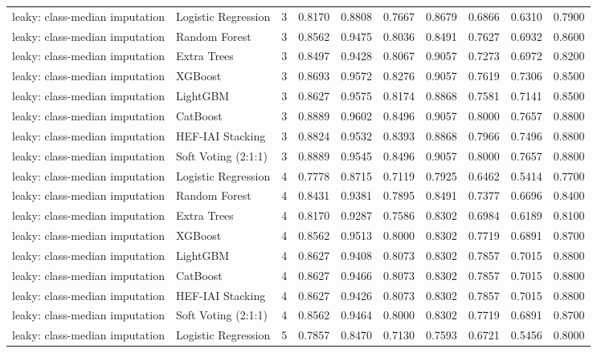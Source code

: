 \begin{tabular}{llrrrrrrrr}
leaky: class-median imputation & Logistic Regression & 3 & 0.8170 & 0.8808 & 0.7667 & 0.8679 & 0.6866 & 0.6310 & 0.7900 \\
leaky: class-median imputation & Random Forest & 3 & 0.8562 & 0.9475 & 0.8036 & 0.8491 & 0.7627 & 0.6932 & 0.8600 \\
leaky: class-median imputation & Extra Trees & 3 & 0.8497 & 0.9428 & 0.8067 & 0.9057 & 0.7273 & 0.6972 & 0.8200 \\
leaky: class-median imputation & XGBoost & 3 & 0.8693 & 0.9572 & 0.8276 & 0.9057 & 0.7619 & 0.7306 & 0.8500 \\
leaky: class-median imputation & LightGBM & 3 & 0.8627 & 0.9575 & 0.8174 & 0.8868 & 0.7581 & 0.7141 & 0.8500 \\
leaky: class-median imputation & CatBoost & 3 & 0.8889 & 0.9602 & 0.8496 & 0.9057 & 0.8000 & 0.7657 & 0.8800 \\
leaky: class-median imputation & HEF-IAI Stacking & 3 & 0.8824 & 0.9532 & 0.8393 & 0.8868 & 0.7966 & 0.7496 & 0.8800 \\
leaky: class-median imputation & Soft Voting (2:1:1) & 3 & 0.8889 & 0.9545 & 0.8496 & 0.9057 & 0.8000 & 0.7657 & 0.8800 \\
leaky: class-median imputation & Logistic Regression & 4 & 0.7778 & 0.8715 & 0.7119 & 0.7925 & 0.6462 & 0.5414 & 0.7700 \\
leaky: class-median imputation & Random Forest & 4 & 0.8431 & 0.9381 & 0.7895 & 0.8491 & 0.7377 & 0.6696 & 0.8400 \\
leaky: class-median imputation & Extra Trees & 4 & 0.8170 & 0.9287 & 0.7586 & 0.8302 & 0.6984 & 0.6189 & 0.8100 \\
leaky: class-median imputation & XGBoost & 4 & 0.8562 & 0.9513 & 0.8000 & 0.8302 & 0.7719 & 0.6891 & 0.8700 \\
leaky: class-median imputation & LightGBM & 4 & 0.8627 & 0.9408 & 0.8073 & 0.8302 & 0.7857 & 0.7015 & 0.8800 \\
leaky: class-median imputation & CatBoost & 4 & 0.8627 & 0.9466 & 0.8073 & 0.8302 & 0.7857 & 0.7015 & 0.8800 \\
leaky: class-median imputation & HEF-IAI Stacking & 4 & 0.8627 & 0.9426 & 0.8073 & 0.8302 & 0.7857 & 0.7015 & 0.8800 \\
leaky: class-median imputation & Soft Voting (2:1:1) & 4 & 0.8562 & 0.9464 & 0.8000 & 0.8302 & 0.7719 & 0.6891 & 0.8700 \\
leaky: class-median imputation & Logistic Regression & 5 & 0.7857 & 0.8470 & 0.7130 & 0.7593 & 0.6721 & 0.5456 & 0.8000 \\

\end{tabular}
